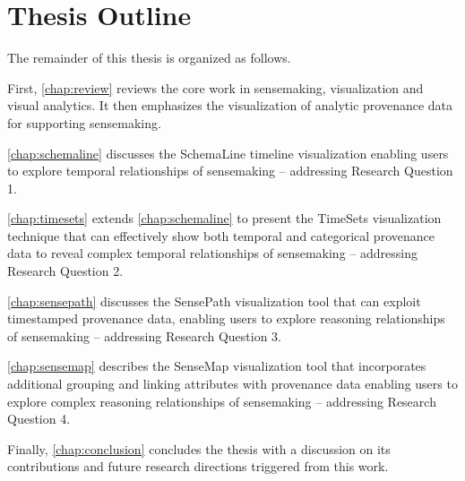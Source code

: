 \section{Thesis Outline}
The remainder of this thesis is organized as follows.

First, \autoref{chap:review} reviews the core work in sensemaking, visualization and visual analytics. It then emphasizes the visualization of analytic provenance data for supporting sensemaking.

\autoref{chap:schemaline} discusses the SchemaLine timeline visualization enabling users to explore temporal relationships of sensemaking -- addressing Research Question 1.

\autoref{chap:timesets} extends \autoref{chap:schemaline} to present the TimeSets visualization technique that can effectively show both temporal and categorical provenance data to reveal complex temporal relationships of sensemaking -- addressing Research Question 2.

\autoref{chap:sensepath} discusses the SensePath visualization tool that can exploit timestamped provenance data, enabling users to explore reasoning relationships of sensemaking -- addressing Research Question 3.

\autoref{chap:sensemap} describes the SenseMap visualization tool that incorporates additional grouping and linking attributes with provenance data enabling users to explore complex reasoning relationships of sensemaking -- addressing Research Question 4.

Finally, \autoref{chap:conclusion} concludes the thesis with a discussion on its contributions and future research directions triggered from this work.